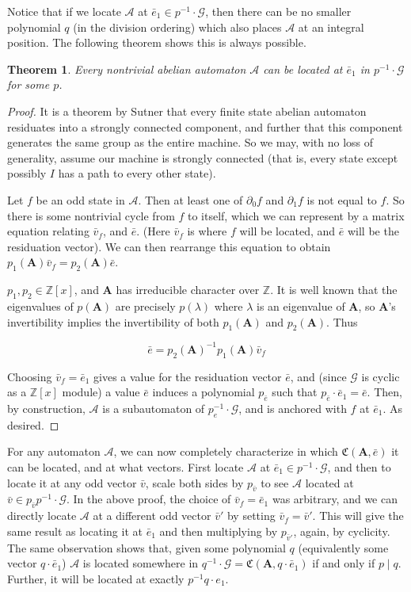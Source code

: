 \documentclass[runningheads]{llncs}
\newcommand{\A}{\mathcal{A}}
\newcommand{\G}{\mathcal{G}}
\newcommand{\C}{\mathfrak{C}(\Am,\e)}
\newcommand{\Z}{\mathbb{Z}}
\newcommand{\2}{\textbf{2}}
\newcommand{\Am}{\textbf{A}}
\newcommand{\del}{\partial}
\newcommand{\vv}{\bar{v}}
\newcommand{\e}{\bar{e}}
\newtheorem{thm}{Theorem}
\begin{document}
Notice that if we locate $\A$ at $\e_1 \in p^{-1} \cdot \G$, 
then there can be no smaller polynomial $q$ (in the division ordering)
which also places $\A$ at an integral position. The following theorem 
shows this is always possible.

\begin{thm}
  Every nontrivial abelian automaton $\A$ can be 
  located at $\e_1$ in $p^{-1} \cdot \G$ for some $p$.
\end{thm}

\begin{proof}
  It is a theorem by Sutner \cite{Sutner18:abelian_automata} that every 
  finite state abelian automaton residuates into a strongly connected component, 
  and further that this component generates the same group as the entire 
  machine. So we may, with no loss of generality, assume our machine is 
  strongly connected (that is, every state except possibly $I$ has a path to
  every other state).

  Let $f$ be an odd state in $\A$. Then at least one of $\del_0 f$ and 
  $\del_1 f$ is not equal to $f$. So there is some nontrivial cycle
  from $f$ to itself, which we can represent by a matrix equation 
  relating $\vv_f$, and $\e$. (Here $\vv_f$ is where $f$ will be located, 
  and $\e$ will be the residuation vector). 
  We can then rearrange this equation to obtain 
  $p_1(\Am)\vv_f = p_2(\Am)\e$.

  $p_1, p_2 \in \Z[x]$, and $\Am$ has irreducible character over $\Z$.
  It is well known that the eigenvalues of $p(\Am)$ are precisely $p(\lambda)$
  where $\lambda$ is an eigenvalue of $\Am$, so $\Am$'s invertibility implies
  the invertibility of both $p_1(\Am)$ and $p_2(\Am)$. Thus

  \[ \e = p_2(\Am)^{-1}p_1(\Am)\vv_f \]

  Choosing $\vv_f = \e_1$ gives a value for the residuation vector $\e$,
  and (since $\G$ is cyclic as a $\Z[x]$ module) a value $\e$ induces a 
  polynomial $p_{\e}$ such that $p_{\e} \cdot \e_1 = \e$. 
  Then, by construction, $\A$ is a subautomaton of $p_e^{-1} \cdot \G$, and is 
  anchored with $f$ at $\e_1$. As desired.
\end{proof}

For any automaton $\A$, we can now completely characterize in
which $\C$ it can be located, and at what vectors.
First locate $\A$ at $\e_1 \in p^{-1} \cdot \G$, and then to locate it at
any odd vector $\vv$, scale both sides by $p_{\vv}$ to see $\A$ located at
$\vv \in p_{\vv} p^{-1} \cdot \G$. 
In the above proof, the choice of $\vv_f = \e_1$ was arbitrary, and we can
directly locate $\A$ at a different odd vector $\vv'$ by setting 
$\vv_f = \vv'$. This will give the same result as locating it at $\e_1$ and 
then multiplying by $p_{\vv'}$, again, by cyclicity.
The same observation shows that, given some polynomial $q$ 
(equivalently some vector $q \cdot \e_1$) $\A$ is located somewhere in 
$q^{-1} \cdot \G = \mathfrak{C}(\Am,q \cdot \e_1)$ if and only if $p \mid q$. 
Further, it will be located at exactly $p^{-1}q \cdot e_1$.
\end{document}
